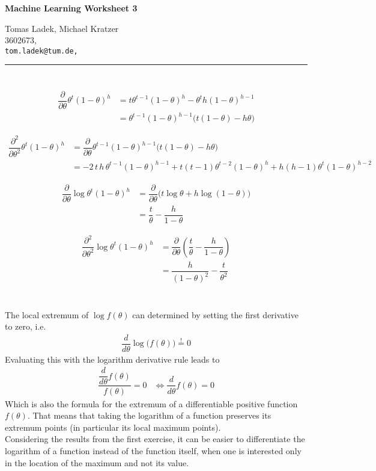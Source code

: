 \documentclass[11pt]{article}
\makeatletter
\newcommand{\exercise}{\section{}}
\newcommand{\hwhead}[4]{
\begin{center}
\sffamily\large\bfseries Machine Learning Worksheet #1
\vspace{2mm}
\normalfont

#2\\
#3\\
\texttt{#4}
\end{center}
\vspace{6mm} \hrule \vspace{4mm}
}
\newcommand{\names}{Tomas Ladek, Michael Kratzer} %
\newcommand{\imats}{3602673, } %
\newcommand{\emails}{tom.ladek@tum.de, } %
\makeatother
\begin{document}
\hwhead{3}{\names}{\imats}{\emails}


\exercise
\begin{align*}
	\dfrac{\partial}{\partial \theta}\theta^t (1-\theta)^h &= t \theta^{t-1} (1-\theta)^h - \theta^t h(1-\theta)^{h-1}\\
	&= \theta^{t-1}(1-\theta)^{h-1}\big(t(1-\theta)-h\theta\big)
\end{align*}

\begin{align*}
	\dfrac{\partial^2}{\partial \theta^2}\theta^t (1-\theta)^h &= \dfrac{\partial}{\partial \theta}\theta^{t-1}(1-\theta)^{h-1}\big(t(1-\theta)-h\theta\big)\\
	 &= -2\,t\,h\,\theta^{t-1}(1-\theta)^{h-1} + t(t-1)\theta^{t-2}(1-\theta)^h + h(h-1)\theta^t(1-\theta)^{h-2}
\end{align*}

\begin{align*}
	\dfrac{\partial}{\partial \theta}\log\theta^t (1-\theta)^h &= \dfrac{\partial}{\partial \theta}\big(t\log\theta + h\log(1-\theta)\big)\\
	&= \dfrac{t}{\theta} - \dfrac{h}{1-\theta}
\end{align*}

\begin{align*}
	\dfrac{\partial^2}{\partial \theta^2}\log\theta^t (1-\theta)^h &= \dfrac{\partial}{\partial \theta}(\dfrac{t}{\theta} - \dfrac{h}{1-\theta})\\
	&= \dfrac{h}{(1-\theta)^2} - \dfrac{t}{\theta^2} 
\end{align*}

\exercise
The local extremum of $\log f(\theta)$ can determined by setting the first derivative to zero, i.e.
\begin{align*}
	\dfrac{d}{d \theta}\log\big(f(\theta)\big) \stackrel{!}{=} 0
\end{align*}
Evaluating this with the logarithm derivative rule leads to 
\begin{align*}
	\dfrac{\dfrac{d}{d\theta}f(\theta)}{f(\theta)} = 0 &\iff \dfrac{d}{d\theta}f(\theta) = 0
\end{align*}
Which is also the formula for the extremum of a differentiable positive function $f(\theta)$. That means that taking the logarithm of a function preserves its extremum points (in particular its local maximum points).\\
Considering the results from the first exercise, it can be easier to differentiate the logarithm of a function instead of the function itself, when one is interested only in the location of the maximum and not its value.

\exercise
\end{document}
